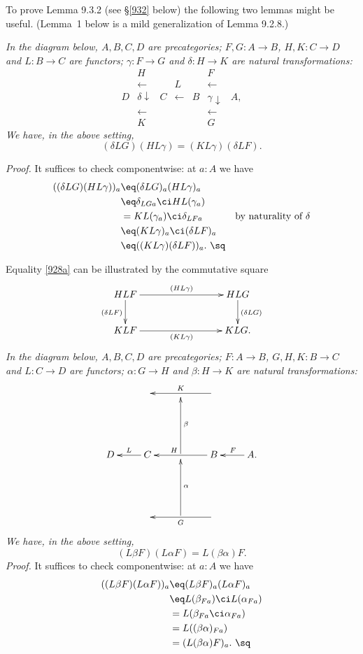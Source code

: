 \documentclass[12pt]{article}
\begin{document}
To prove Lemma 9.3.2 (see \S\ref{932} below) the following two lemmas might be useful. (Lemma~1 below is a mild generalization of Lemma 9.2.8.)

\nn{} \emph{In the diagram below, $A,B,C,D$ are precategories; $F,G:A\to B$, $H,K:C\to D$ and $L:B\to C$ are functors; $\gamma:F\to G$ and $\delta:H\to K$ are natural transformations:
$$
\begin{array}{ccccccc}
&H&&&&F\\
&\leftarrow&&L&&\leftarrow\\
D&\delta\downarrow&C&\leftarrow&B&\gamma\downarrow&A,\\
&\leftarrow&&&&\leftarrow\\
&K&&&&G
\end{array}
$$
We have, in the above setting,}
\begin{equation}\label{928a}
(\delta LG)(HL\gamma)=(KL\gamma)(\delta LF).
\end{equation}

\nn\emph{Proof.} It suffices to check componentwise: at $a:A$ we have
\begin{align*}
((\delta LG)(HL\gamma))_a
&\eq(\delta LG)_a(HL\gamma)_a\\
&\eq\delta_{LGa}\ci HL(\gamma_a)\\
&=KL(\gamma_a)\ci\delta_{LFa}&\text{by naturality of $\delta$}\\
&\eq(KL\gamma)_a\ci(\delta LF)_a\\
&\eq((KL\gamma)(\delta LF))_a.\ \sq
\end{align*}

Equality \eqref{928a} can be illustrated by the commutative square 
$$
\xymatrix{
HLF\ar[rrr]^{(HL\gamma)}\ar[d]_{(\delta LF)}&&&HLG\ar[d]^{(\delta LG)}\\ 
KLF\ar[rrr]_{(KL\gamma)}&&&KLG.}
$$ 
 \emph{In the diagram below, $A,B,C,D$ are precategories; $F:A\to B$, $G,H,K:B\to C$ and $L:C\to D$ are functors; $\alpha:G\to H$ and $\beta:H\to K$ are natural transformations:
$$
\xymatrix{
&&&\ar[ll]_K\\ \\
D&C\ar[l]_L&\ar[uu]_\beta&B\ar[ll]_(.6)H&A.\ar[l]_F\\ \\
&&\ar[uu]_\alpha&\ar[ll]^G}
$$ 
We have, in the above setting,}
\begin{equation}\label{928b}
(L\beta F)(L\alpha F)=L(\beta\alpha)F.
\end{equation}
\emph{Proof.} It suffices to check componentwise: at $a:A$ we have
\begin{align*}
((L\beta F)(L\alpha F))_a
&\eq(L\beta F)_a(L\alpha F)_a\\
&\eq L(\beta_{Fa})\ci L(\alpha_{Fa})\\
&=L(\beta_{Fa}\ci\alpha_{Fa})\\
&=L((\beta\alpha)_{Fa})\\ 
&=(L(\beta\alpha)F)_a.\ \sq
\end{align*}
\end{document}
